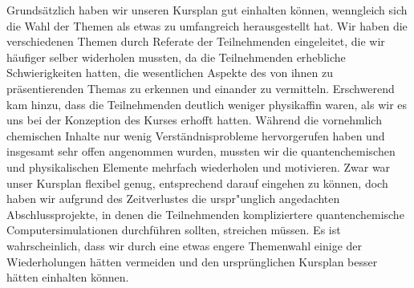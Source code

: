 \documentclass{scrartcl}
\begin{document}
Grunds{\"a}tzlich haben wir unseren Kursplan gut einhalten k{\"o}nnen,
wenngleich sich die Wahl der Themen als etwas zu umfangreich herausgestellt hat.
Wir haben die verschiedenen Themen durch Referate der Teilnehmenden eingeleitet,
die wir h{\"a}ufiger selber widerholen mussten, da die
Teilnehmenden erhebliche Schwierigkeiten hatten, die wesentlichen Aspekte des
von ihnen zu pr{\"a}sentierenden Themas zu erkennen und einander zu
vermitteln.
Erschwerend kam hinzu, dass die Teilnehmenden deutlich weniger physikaffin
waren, als wir es uns bei der Konzeption des Kurses erhofft hatten.
W{\"a}hrend die vornehmlich chemischen Inhalte nur wenig Verst{\"a}ndnisprobleme
hervorgerufen haben und insgesamt sehr offen angenommen wurden, mussten wir die
quantenchemischen und physikalischen Elemente mehrfach wiederholen und
motivieren. Zwar war unser Kursplan flexibel genug, entsprechend darauf eingehen
zu k{\"o}nnen, doch haben wir aufgrund des Zeitverlustes die urspr{"u}nglich
angedachten Abschlussprojekte, in denen die Teilnehmenden kompliziertere
quantenchemische Computersimulationen durchf{\"u}hren sollten, streichen
m{\"u}ssen. Es ist wahrscheinlich, dass wir durch eine etwas engere Themenwahl
einige der Wiederholungen h{\"a}tten vermeiden und den urspr{\"u}nglichen
Kursplan besser h{\"a}tten einhalten k{\"o}nnen.
\medskip
\end{document}
